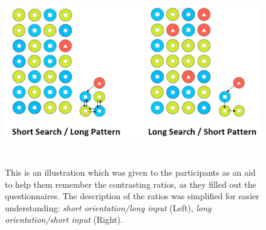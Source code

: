 \begin{figure}[H]
\includegraphics[width=15cm, height=8cm]{Chapters/graphics/illustration.PNG}
\caption{This is an illustration which was given to the participants as an aid to help them remember the contrasting ratios, as they filled out the questionnaires. The description of the ratios was simplified for easier understanding: \textit{short orientation/long input} (Left), \textit{long orientation/short input} (Right).}
\label{fig:illustration}
\end{figure}




